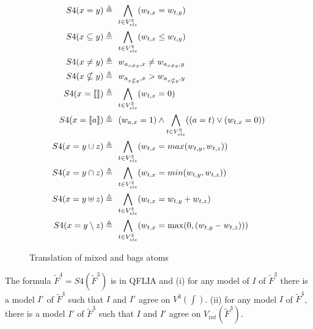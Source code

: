 \begin{figure}
\begin{mdframed}
\begin{align*}
 S4(x = y)           \triangleq &\ \   \underset{t \in V^3_{ele}}{\bigwedge}(w_{t,x} = w_{t,y})   \\
 S4(x \subseteq y)   \triangleq &\ \   \underset{t \in V^3_{ele}}{\bigwedge}(w_{t,x} \le w_{t,y})   \\
 S4(x \neq y)        \triangleq &\ \   w_{a_{x \neq y},x} \neq w_{a_{x \neq y},y}   \\
 S4(x \nsubseteq y)  \triangleq &\ \   w_{a_{x \nsubseteq y},x} > w_{a_{x \nsubseteq y},y}   \\
 S4(x = \llbracket  \rrbracket )  \triangleq &\ \   \underset{t\in V^3_{ele}}{\bigwedge}(w_{t,x} = 0)  \\
 S4(x = \llbracket a \rrbracket)  \triangleq &\ \   (w_{a,x} = 1)  \land \underset{t\in V^3_{ele}}{\bigwedge}((a = t) \lor (w_{t,x} = 0))    \\
 S4(x = y \cup z)    \triangleq &\ \   \underset{t\in V^3_{ele}}{\bigwedge}(w_{t,x} = max(w_{t,y},w_{t,z}))   \\
 S4(x = y \cap z)    \triangleq &\ \   \underset{t\in V^3_{ele}}{\bigwedge}(w_{t,x} = min(w_{t,y},w_{t,z}))   \\
 S4(x = y \uplus z)   \triangleq &\ \   \underset{t\in V^3_{ele}}{\bigwedge}(w_{t,x} = w_{t,y}+w_{t,z})   \\
 S4(x = y \setminus z) \triangleq &\ \   \underset{t\in V^3_{ele}}{\bigwedge}(w_{t,x} = \max(0,(w_{t,y}-w_{t,z})))
\end{align*}
\caption{Translation of mixed and bags atoms}
\label{fig:S4}
\end{mdframed}
\end{figure}

\begin{myprop}
\label{prop:final}
The formula $\tilde{F}^4 = S4(\tilde{F}^3)$ is in QFLIA and
(i) for any model of $I$ of $\tilde{F}^3$ there is a model $I'$ of $\tilde{F}^4$ such that $I$ and $I'$ agree on $V^3(\int)$.
(ii) for any model $I$ of $\tilde{F}^4$, there is a model $I'$ of $\tilde{F}^3$ such that $I$ and $I'$ agree on $V_{int}(\tilde{F}^3)$.
\end{myprop}

